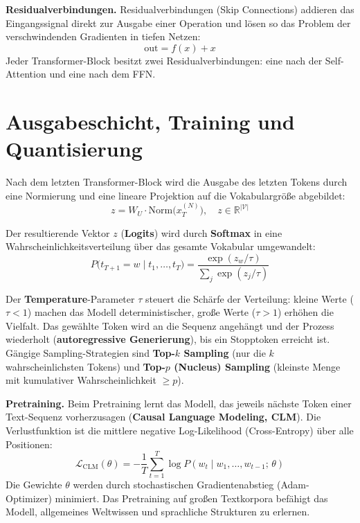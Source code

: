 \textbf{Residualverbindungen.}
Residualverbindungen (Skip Connections) addieren das Eingangssignal
direkt zur Ausgabe einer Operation und lösen so das Problem der
verschwindenden Gradienten in tiefen Netzen:
\begin{equation}
    \text{out} = f(x) + x
    \label{eq:residual}
\end{equation}
Jeder Transformer-Block besitzt zwei Residualverbindungen: eine
nach der Self-Attention und eine nach dem FFN.

\section{Ausgabeschicht, Training und Quantisierung}
\label{sec:ausgabe_training}

Nach dem letzten Transformer-Block wird die Ausgabe des letzten Tokens
durch eine Normierung und eine lineare Projektion auf die Vokabulargröße
abgebildet:
\begin{equation}
    z = W_U \cdot \text{Norm}\!\bigl(x_T^{(N)}\bigr),
    \quad z \in \mathbb{R}^{|\mathcal{V}|}
    \label{eq:logits}
\end{equation}

Der resultierende Vektor $z$ (\textbf{Logits}) wird durch
\textbf{Softmax} in eine Wahrscheinlichkeitsverteilung über das
gesamte Vokabular umgewandelt:
\begin{equation}
    P\!\bigl(t_{T+1} = w \mid t_1, \ldots, t_T\bigr) =
    \frac{\exp(z_w / \tau)}{\sum_{j} \exp(z_j / \tau)}
    \label{eq:softmax}
\end{equation}

Der \textbf{Temperature}-Parameter $\tau$ steuert die Schärfe der
Verteilung: kleine Werte ($\tau < 1$) machen das Modell
deterministischer, große Werte ($\tau > 1$) erhöhen die Vielfalt.
Das gewählte Token wird an die Sequenz angehängt und der Prozess
wiederholt (\textbf{autoregressive Generierung}), bis ein Stopptoken
erreicht ist.
Gängige Sampling-Strategien sind \textbf{Top-$k$ Sampling}
(nur die $k$ wahrscheinlichsten Tokens) und
\textbf{Top-$p$ (Nucleus) Sampling} (kleinste Menge mit
kumulativer Wahrscheinlichkeit $\geq p$).

\textbf{Pretraining.}\label{sec:training}
Beim Pretraining lernt das Modell, das jeweils nächste Token einer
Text-Sequenz vorherzusagen (\textbf{Causal Language Modeling, CLM}).
Die Verlustfunktion ist die mittlere negative Log-Likelihood
(Cross-Entropy) über alle Positionen:
\begin{equation}
    \mathcal{L}_{\text{CLM}}(\theta) =
    -\frac{1}{T}\sum_{t=1}^{T} \log P(w_t \mid w_1, \ldots, w_{t-1};\, \theta)
    \label{eq:clm}
\end{equation}
Die Gewichte $\theta$ werden durch stochastischen Gradientenabstieg
(Adam-Optimizer) minimiert. Das Pretraining auf großen Textkorpora
befähigt das Modell, allgemeines Weltwissen und sprachliche Strukturen
zu erlernen.

